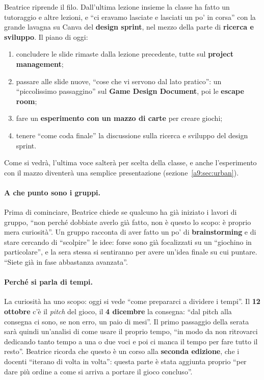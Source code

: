 Beatrice riprende il filo. Dall'ultima lezione insieme la classe ha fatto un
tutoraggio e altre lezioni, e ``ci eravamo lasciate e lasciati un po' in corsa'' con
la grande lavagna su Canva del \textbf{design sprint}, nel mezzo della parte di
\textbf{ricerca e sviluppo}. Il piano di oggi:
\begin{enumerate}
  \item concludere le slide rimaste dalla lezione precedente, tutte sul
        \textbf{project management};
  \item passare alle slide nuove, ``cose che vi servono dal lato pratico'': un
        ``piccolissimo passaggino'' sul \textbf{Game Design Document}, poi le
        \textbf{escape room};
  \item fare un \textbf{esperimento con un mazzo di carte} per creare giochi;
  \item tenere ``come coda finale'' la discussione sulla ricerca e sviluppo del
        design sprint.
\end{enumerate}
Come si vedrà, l'ultima voce salterà per scelta della classe, e anche l'esperimento
con il mazzo diventerà una semplice presentazione (sezione~\ref{a9:sec:urban}).

\paragraph{A che punto sono i gruppi.} Prima di cominciare, Beatrice chiede se
qualcuno ha già iniziato i lavori di gruppo, ``non perché dobbiate averlo già fatto,
non è questo lo scopo: è proprio mera curiosità''. Un gruppo racconta di aver fatto
un po' di \textbf{brainstorming} e di stare cercando di ``scolpire'' le idee: forse
sono già focalizzati su un ``giochino in particolare'', e la sera stessa si
sentiranno per avere un'idea finale su cui puntare. ``Siete già in fase abbastanza
avanzata''.

\paragraph{Perché si parla di tempi.} La curiosità ha uno scopo: oggi si vede ``come
prepararci a dividere i tempi''. Il \textbf{12 ottobre} c'è il \emph{pitch} del
gioco, il \textbf{4 dicembre} la consegna: ``dal pitch alla consegna ci sono, se non
erro, un paio di mesi''. Il primo passaggio della serata sarà quindi un'analisi di
come usare il proprio tempo, ``in modo da non ritrovarci dedicando tanto tempo a una o
due voci e poi ci manca il tempo per fare tutto il resto''. Beatrice ricorda che
questo è un corso alla \textbf{seconda edizione}, che i docenti ``iterano di volta in
volta'': questa parte è stata aggiunta proprio ``per dare più ordine a come si arriva
a portare il gioco concluso''.

